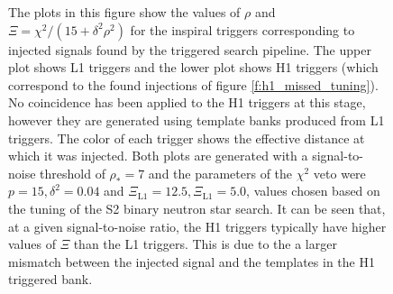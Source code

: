 \begin{figure}[p]
\caption[Illustration of Tuning Based on Injections]{%
\label{f:h1_inj_xi_tuning}
The plots in this figure show the values of $\rho$ and $\Xi = \chi^2/(15 +
\delta^2\rho^2)$ for the inspiral triggers corresponding to injected signals
found by the triggered search pipeline. The upper plot shows L1 triggers and
the lower plot shows H1 triggers (which correspond to the found injections of
figure \ref{f:h1_missed_tuning}). No coincidence has been applied to the H1
triggers at this stage, however they are generated using template banks
produced from L1 triggers. The color of each trigger shows the effective
distance at which it was injected.  Both plots are generated with a
signal-to-noise threshold of $\rho_\ast = 7$ and the parameters of the
$\chi^2$ veto were $p = 15, \delta^2 = 0.04$ and $\Xi_\mathrm{L1} = 12.5,
\Xi_\mathrm{L1} = 5.0$, values chosen based on the tuning of the S2 binary
neutron star search. It can be seen that, at a given signal-to-noise ratio,
the H1 triggers typically have higher values of $\Xi$ than the L1 triggers.
This is due to the a larger mismatch between the injected signal and the
templates in the H1 triggered bank.
}
\end{figure}

